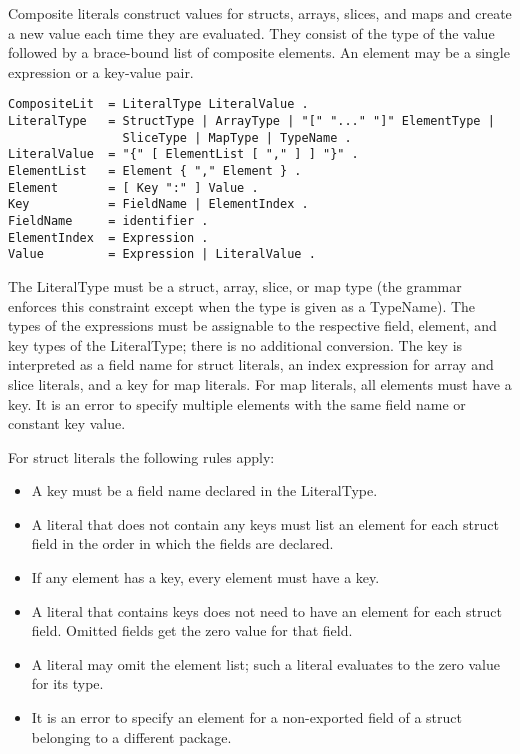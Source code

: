 Composite literals construct values for structs, arrays, slices, and
maps and create a new value each time they are evaluated. They consist
of the type of the value followed by a brace-bound list of composite
elements. An element may be a single expression or a key-value pair.

\begin{Verbatim}[frame=single]
CompositeLit  = LiteralType LiteralValue .
LiteralType   = StructType | ArrayType | "[" "..." "]" ElementType |
                SliceType | MapType | TypeName .
LiteralValue  = "{" [ ElementList [ "," ] ] "}" .
ElementList   = Element { "," Element } .
Element       = [ Key ":" ] Value .
Key           = FieldName | ElementIndex .
FieldName     = identifier .
ElementIndex  = Expression .
Value         = Expression | LiteralValue .
\end{Verbatim}

The LiteralType must be a struct, array, slice, or map type (the grammar
enforces this constraint except when the type is given as a TypeName).
The types of the expressions must be
assignable to the respective field, element,
and key types of the LiteralType; there is no additional conversion. The
key is interpreted as a field name for struct literals, an index
expression for array and slice literals, and a key for map literals. For
map literals, all elements must have a key. It is an error to specify
multiple elements with the same field name or constant key value.

For struct literals the following rules apply:

\begin{itemize}
\item
  A key must be a field name declared in the LiteralType.
\item
  A literal that does not contain any keys must list an element for each
  struct field in the order in which the fields are declared.
\item
  If any element has a key, every element must have a key.
\item
  A literal that contains keys does not need to have an element for each
  struct field. Omitted fields get the zero value for that field.
\item
  A literal may omit the element list; such a literal evaluates to the
  zero value for its type.
\item
  It is an error to specify an element for a non-exported field of a
  struct belonging to a different package.
\end{itemize}

